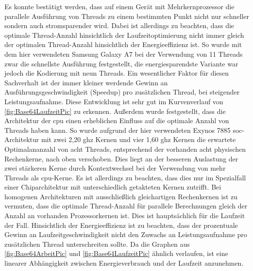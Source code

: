 Es konnte bestätigt werden, dass auf einem Gerät mit Mehrkernprozessor die parallele Ausführung von Threads zu einem bestimmten Punkt nicht nur schneller sondern auch stromsparender wird. Dabei ist allerdings zu beachten, dass die optimale Thread-Anzahl hinsichtlich der Laufzeitoptimierung nicht immer gleich der optimalen Thread-Anzahl hinsichtlich der Energieeffizienz ist. So wurde mit dem hier verwendeten Samsung Galaxy A7 bei der Verwendung von 11 Threads zwar die schnellste Ausführung festgestellt, die energiesparendste Variante war jedoch die Kodierung mit neun Threads. Ein wesentlicher Faktor für diesen Sachverhalt ist der immer kleiner werdende Gewinn an Ausführungsgeschwindigkeit (Speedup) pro zusätzlichen  Thread, bei steigender Leistungsaufnahme. Diese Entwicklung ist sehr gut im Kurvenverlauf von \autoref{fig:Base64LaufzeitPic} zu erkennen. Außerdem wurde festgestellt, dass die Architektur der \ac{cpu} einen erheblichen Einfluss auf die optimale Anzahl von Threads  haben kann. So wurde aufgrund der hier verwendeten Exynos 7885 \ac{soc}-Architektur mit zwei 2,20 \ac{ghz} Kernen und vier 1,60 \ac{ghz} Kernen die erwartete Optimalananzahl von acht Threads, entsprechend der vorhanden acht physischen Rechenkerne, nach oben verschoben. Dies liegt an der besseren Auslastung der zwei stärkeren Kerne durch Kontextwechsel bei der Verwendung von mehr Threads als \ac{cpu}-Kerne. Es ist allerdings zu beachten, dass dies nur im Spezialfall einer Chiparchitektur mit unterschiedlich getakteten Kernen zutrifft. Bei homogenen Architekturen mit ausschließlich gleichartigen Rechenkernen ist zu vermuten, dass die optimale Thread-Anzahl für parallele Berechnungen gleich der Anzahl an vorhanden Prozessorkernen ist. Dies ist hauptsächlich für die Laufzeit der Fall. Hinsichtlich der Energieeffizienz ist zu beachten, dass der prozentuale Gewinn an Laufzeitgeschwindigkeit nicht den Zuwachs an Leistungsaufnahme pro zusätzlichen Thread unterschreiten sollte. Da die Graphen aus \autoref{fig:Base64ArbeitPic} und \autoref{fig:Base64LaufzeitPic} ähnlich verlaufen, ist eine linearer Abhängigkeit zwischen Energieverbrauch und der Laufzeit anzunehmen.